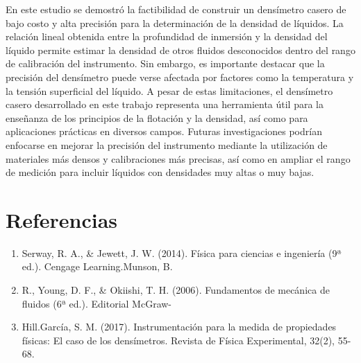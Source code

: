 \documentclass[article,12pt]{elsarticle}
\begin{document}
En este estudio se demostró la factibilidad de construir un densímetro casero de bajo costo y alta precisión para la determinación de la densidad de líquidos. La relación lineal obtenida entre la profundidad de inmersión y la densidad del líquido permite estimar la densidad de otros fluidos desconocidos dentro del rango de calibración del instrumento. Sin embargo, es importante destacar que la precisión del densímetro puede verse afectada por factores como la temperatura y la tensión superficial del líquido. A pesar de estas limitaciones, el densímetro casero desarrollado en este trabajo representa una herramienta útil para la enseñanza de los principios de la flotación y la densidad, así como para aplicaciones prácticas en diversos campos. Futuras investigaciones podrían enfocarse en mejorar la precisión del instrumento mediante la utilización de materiales más densos y calibraciones más precisas, así como en ampliar el rango de medición para incluir líquidos con densidades muy altas o muy bajas.

\section{Referencias}
\begin{enumerate}
    \item Serway, R. A., & Jewett, J. W. (2014). Física para ciencias e ingeniería (9ª ed.). Cengage Learning.Munson, B. \item R., Young, D. F., & Okiishi, T. H. (2006). Fundamentos de mecánica de fluidos (6ª ed.). Editorial McGraw-\item Hill.García, S. M. (2017). Instrumentación para la medida de propiedades físicas: El caso de los densímetros. Revista de Física Experimental, 32(2), 55-68.
\end{enumerate}
\end{document}
